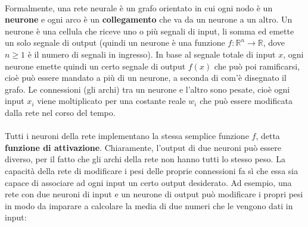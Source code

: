 \documentclass{article}
\begin{document}
\paragraph{} Formalmente, una rete neurale è un grafo orientato in cui ogni nodo è un \textbf{neurone} e ogni arco è un \textbf{collegamento} che va da un neurone a un altro. Un neurone è una cellula che riceve uno o più segnali di input, li somma ed emette un solo segnale di output (quindi un neurone è una funzione $f : \mathbb{R}^n \rightarrow \mathbb{R}$, dove $n \ge 1$ è il numero di segnali in ingresso). In base al segnale totale di input $x$, ogni neurone emette quindi un certo segnale di output $f(x)$ che può poi ramificarsi, cioè può essere mandato a più di un neurone, a seconda di com'è disegnato il grafo. Le connessioni (gli archi) tra un neurone e l'altro sono pesate, cioè ogni input $x_i$ viene moltiplicato per una costante reale $w_i$ che può essere modificata dalla rete nel corso del tempo.

\paragraph{} Tutti i neuroni della rete implementano la stessa semplice funzione $f$, detta \textbf{funzione di attivazione}. Chiaramente, l'output di due neuroni può essere diverso, per il fatto che gli archi della rete non hanno tutti lo stesso peso. La capacità della rete di modificare i pesi delle proprie connessioni fa sì che essa sia capace di associare ad ogni input un certo output desiderato. Ad esempio, una rete con due neuroni di input e un neurone di output può modificare i propri pesi in modo da imparare a calcolare la media di due numeri che le vengono dati in input:

\begin{center}
\end{center}
\end{document}
